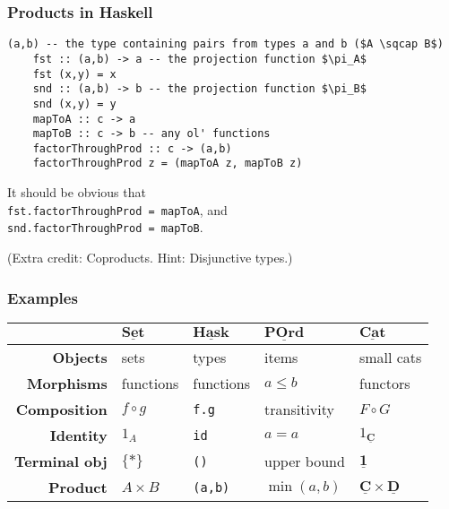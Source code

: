 \documentclass[10pt]{beamer}
\newcommand{\Cat}[1]{\ensuremath{\underline{\mathbf{#1}}}}
\theoremstyle{definition}
\theoremstyle{remark}
\numberwithin{equation}{section}
\begin{document}
\begin{frame}[fragile]
  \frametitle{Products in Haskell}
  \begin{lstlisting}[frame=single,mathescape=true]
    (a,b) -- the type containing pairs from types a and b ($A \sqcap B$)
    fst :: (a,b) -> a -- the projection function $\pi_A$
    fst (x,y) = x
    snd :: (a,b) -> b -- the projection function $\pi_B$
    snd (x,y) = y
    mapToA :: c -> a
    mapToB :: c -> b -- any ol' functions
    factorThroughProd :: c -> (a,b)
    factorThroughProd z = (mapToA z, mapToB z)
  \end{lstlisting}

  It should be obvious that\\
  \lstinline{fst.factorThroughProd = mapToA}, and\\
  \lstinline{snd.factorThroughProd = mapToB}.
  
  {\footnotesize (Extra credit: Coproducts. Hint: Disjunctive types.)}
\end{frame}

\begin{frame}[fragile]
  \frametitle{Examples}

  \begin{center}
    \begin{tabular}{r l l l l}\toprule
    & $\Cat{Set}$ & $\Cat{Hask}$ & $\Cat{POrd}$ & $\Cat{Cat}$ \\\midrule
    \textbf{Objects} & sets & types & items & small cats \\
    \textbf{Morphisms} & functions & functions & $a \leq b$ & functors \\
    \textbf{Composition} & $f \circ g$ & \lstinline!f.g! & transitivity & $F \circ G$ \\
    \textbf{Identity} & $1_A$ & {\lstinline!id!} & $a = a$ & $1_{\Cat{C}}$ \\
    \textbf{Terminal obj\rlap{.}} & $\{*\}$ & \lstinline!()! & upper bound & $\Cat{1}$ \\
    \textbf{Product} & $A \times B$ & \lstinline!(a,b)! & $\min(a,b)$ & $\Cat{C} \times \Cat{D}$ \\
      \bottomrule
  \end{tabular}
  \end{center}
\end{frame}
\end{document}
